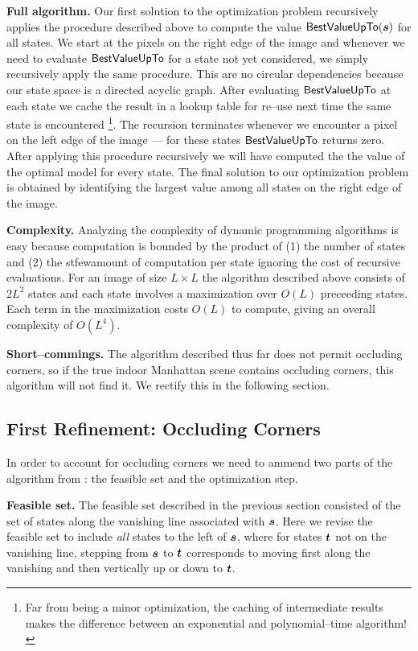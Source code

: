 \textbf{Full algorithm.} Our first solution to the optimization
problem  recursively applies the procedure described
above to compute the value $\bestvalue(\State)$ for all states. We
start at the pixels on the right edge of the image and whenever we
need to evaluate $\bestvalue$ for a state not yet considered, we
simply recursively apply the same procedure. This are no circular
dependencies because our state space is a directed acyclic
graph. After evaluating $\bestvalue$ at each state we cache the result
in a lookup table for re--use next time the same state is
encountered \footnote{Far from being a minor optimization, the caching
  of intermediate results makes the difference between an exponential
  and polynomial--time algorithm!}. The recursion terminates whenever
we encounter a pixel on the left edge of the image --- for these
states $\bestvalue$ returns zero. After applying this procedure
recursively we will have computed the the value of the optimal model
for every state. The final solution to our optimization problem is
obtained by identifying the largest value among all states on the
right edge of the image.

\textbf{Complexity.} Analyzing the complexity of dynamic programming
algorithms is easy because computation is bounded by the product of
(1) the number of states and (2) the stfewamount of computation per
state ignoring the cost of recursive evaluations. For an image of size
$L \times L$ the algorithm described above consists of $2L^2$ states
and each state involves a maximization over $O(L)$ preceeding
states. Each term in the maximization costs $O(L)$ to compute, giving
an overall complexity of $O(L^4)$.

\textbf{Short--commings.} The algorithm described thus far does not
permit occluding corners, so if the true indoor Manhattan scene
contains occluding corners, this algorithm will not find it. We
rectify this in the following section.

\subsection{First Refinement: Occluding Corners}

In order to account for occluding corners we need to ammend two
parts of the algorithm from : the
feasible set and the optimization step.

\textbf{Feasible set.} The feasible set described in the previous
section consisted of the set of states along the vanishing line
associated with $\State$. Here we revise the feasible set to include
\textit{all} states to the left of $\State$, where for states
$\OtherState$ not on the vanishing line, stepping from $\State$ to
$\OtherState$ corresponds to moving first along the vanishing and then
vertically up or down to $\OtherState$.

